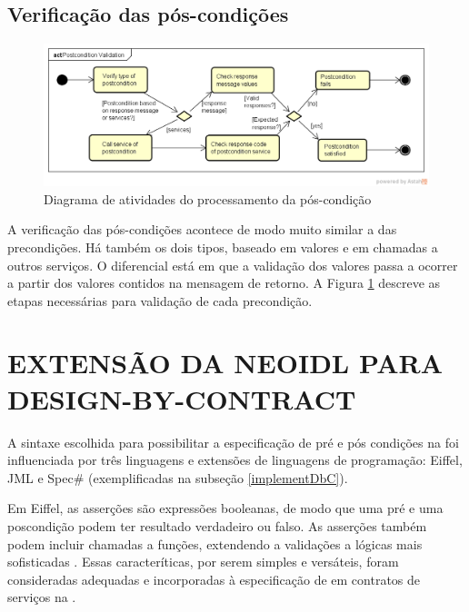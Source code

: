 \subsection{Verificação das pós-condições}
\vspace{-6mm}

\begin{figure}[!htb]
\centering
\includegraphics[width=\textwidth,trim = 0mm 5mm 0mm
0mm,clip]{img/PostconditionValidation.png} 
\vspace{-6mm}
\caption{Diagrama de atividades do processamento da pós-condição}
\label{FigServicePostcondition}
\end{figure}

A verificação das pós-condições acontece de modo muito similar a das
precondições. Há também os dois tipos, baseado em valores e em chamadas a
outros serviços. O diferencial está em que a validação dos valores passa a
ocorrer a partir dos valores contidos na mensagem de retorno. A Figura
\ref{FigServicePostcondition} descreve as etapas necessárias para validação de
cada precondição.


\section{EXTENSÃO DA NEOIDL PARA DESIGN-BY-CONTRACT}
\label{extensaoNeoIDL-DbC}

A sintaxe escolhida para possibilitar a especificação de pré e pós condições
na \neoidl{} foi influenciada por três linguagens e extensões de linguagens de
programação: Eiffel, JML e Spec\# (exemplificadas na subseção
\ref{implementDbC}). 

Em Eiffel, as asserções são expressões booleanas, de modo que uma pré e uma
poscondição podem ter resultado verdadeiro ou falso. As asserções também podem
incluir chamadas a funções, extendendo a validações a lógicas mais sofisticadas
\cite{meyer1992applying}. Essas caracteríticas, por serem simples e versáteis,
foram consideradas adequadas e incorporadas à especificação de
\designbycontract{} em contratos de serviços na \neoidl{}.

